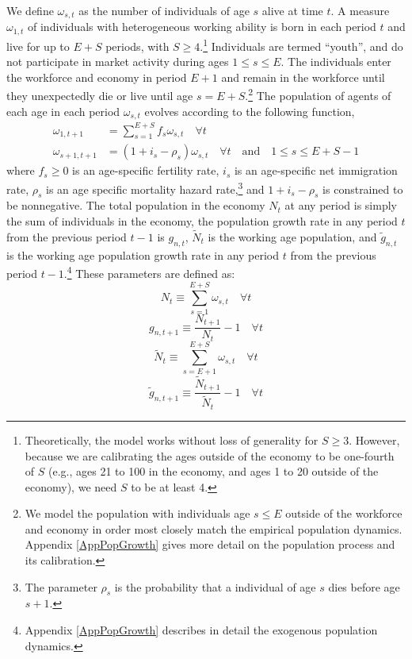 \documentclass[letterpaper,12pt]{article}
\theoremstyle{definition}
\begin{document}
\begin{spacing}{1.5}
    We define $\omega_{s,t}$ as the number of individuals of age $s$ alive at time $t$. A measure $\omega_{1,t}$ of individuals with heterogeneous working ability is born in each period $t$ and live for up to $E+S$ periods, with $S\geq 4$.\footnote{Theoretically, the model works without loss of generality for $S\geq 3$. However, because we are calibrating the ages outside of the economy to be one-fourth of $S$ (e.g., ages 21 to 100 in the economy, and ages 1 to 20 outside of the economy), we need $S$ to be at least 4.} Individuals are termed ``youth'', and do not participate in market activity during ages $1\leq s\leq E$. The individuals enter the workforce and economy in period $E+1$ and remain in the workforce until they unexpectedly die or live until age $s=E+S$.\footnote{We model the population with individuals age $s\leq E$ outside of the workforce and economy in order most closely match the empirical population dynamics. Appendix \ref{AppPopGrowth} gives more detail on the population process and its calibration.} The population of agents of each age in each period $\omega_{s,t}$ evolves according to the following function,
    \begin{equation}\label{EqPopLawofmotion}
      \begin{split}
        \omega_{1,t+1} &= \sum_{s=1}^{E+S} f_s\omega_{s,t}\quad\forall t \\
        \omega_{s+1,t+1} &= (1 + i_s - \rho_s)\omega_{s,t}\quad\forall t\quad\text{and}\quad 1\leq s \leq E+S-1
      \end{split}
    \end{equation}
    where $f_s\geq 0$ is an age-specific fertility rate, $i_s$ is an age-specific net immigration rate, $\rho_s$ is an age specific mortality hazard rate,\footnote{The parameter $\rho_s$ is the probability that a individual of age $s$ dies before age $s+1$.} and $1+i_s-\rho_s$ is constrained to be nonnegative. The total population in the economy $N_t$ at any period is simply the sum of individuals in the economy, the population growth rate in any period $t$ from the previous period $t-1$ is $g_{n,t}$, $\tilde{N}_t$ is the working age population, and $\tilde{g}_{n,t}$ is the working age population growth rate in any period $t$ from the previous period $t-1$.\footnote{Appendix \ref{AppPopGrowth} describes in detail the exogenous population dynamics.} These parameters are defined as:
    \begin{equation}\label{EqPopDef}
      N_t\equiv\sum_{s=1}^{E+S} \omega_{s,t} \quad\forall t
    \end{equation}
    \begin{equation}\label{EqPopGrowth}
      g_{n,t+1} \equiv \frac{N_{t+1}}{N_t} - 1 \quad\forall t
    \end{equation}
    \begin{equation}\label{EqPopWkDef}
      \tilde{N}_t\equiv\sum_{s=E+1}^{E+S} \omega_{s,t} \quad\forall t
    \end{equation}
    \begin{equation}\label{EqPopWkGrowth}
      \tilde{g}_{n,t+1} \equiv \frac{\tilde{N}_{t+1}}{\tilde{N}_t} - 1 \quad\forall t
    \end{equation}


\end{spacing}
\end{document}
